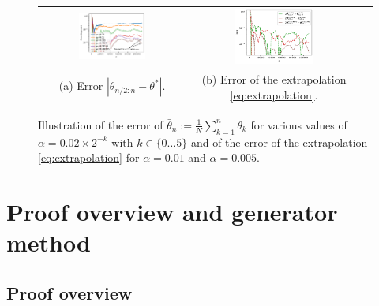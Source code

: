 \documentclass{article}
\newcommand\abs[1]{\left|#1\right|}
\begin{document}
\begin{figure}
    \begin{tabular}{@{}c@{}c@{}c@{}}
        \includegraphics[width=0.48\textwidth]{stoch_approx_avg_error.pdf}
        &\includegraphics[width=0.48\textwidth]{stoch_approx_avg_extrapolation.pdf} \\
        (a) Error $\abs{\bar{\theta}_{n/2:n}-\theta^*}$.
        &(b) Error of the extrapolation \eqref{eq:extrapolation}.
    \end{tabular}
    \caption{Illustration of the error of $\bar{\theta}_n := \frac1N \sum_{k=1}^{n} \theta_{k}$ for various values of $\alpha=0.02\times2^{-k}$ with $k\in\{0\dots5\}$ and of the error of the extrapolation \eqref{eq:extrapolation} for $\alpha=0.01$ and $\alpha=0.005$.}
    \label{fig:illustration_bias_X_bar_2}
\end{figure}









\section{Proof overview and generator method}
\label{sec:proof}


\subsection{Proof overview}
\end{document}

